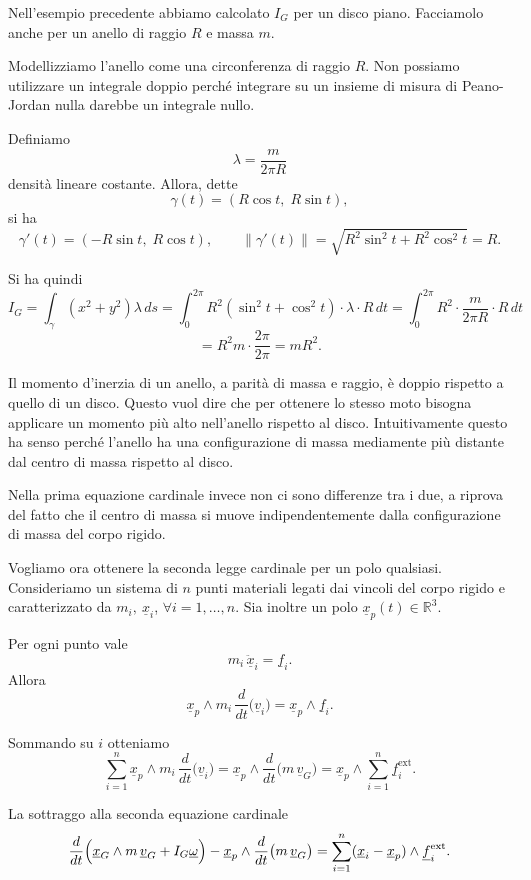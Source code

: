 \begin{example}{}
Nell'esempio precedente abbiamo calcolato \(I_G\) per un disco piano.
Facciamolo anche per un anello di raggio \(R\) e massa \(m\).

Modellizziamo l'anello come una circonferenza di raggio \(R\).
Non possiamo utilizzare un integrale doppio perché integrare su un insieme di
misura di Peano-Jordan nulla darebbe un integrale nullo.

Definiamo
\[
\lambda=\frac{m}{2\pi R}
\]
densità lineare costante. Allora, dette
\[
\gamma(t)=(R\cos t,\;R\sin t),
\]
si ha
\[
\gamma'(t)=(-R\sin t,\;R\cos t),
\qquad
\|\gamma'(t)\|=\sqrt{R^2\sin^2 t+R^2\cos^2 t}=R.
\]

Si ha quindi
\[
I_G=\int_{\gamma}(x^2+y^2)\lambda\,ds
=\int_0^{2\pi} R^2(\sin^2 t+\cos^2 t)\cdot \lambda \cdot R\,dt
=\int_0^{2\pi} R^2\cdot \frac{m}{2\pi R}\cdot R\,dt
\]
\[
=R^2m\cdot \frac{2\pi}{2\pi}=mR^2.
\]

Il momento d'inerzia di un anello, a parità di massa e raggio, è doppio rispetto
a quello di un disco. Questo vuol dire che per ottenere lo stesso moto bisogna
applicare un momento più alto nell'anello rispetto al disco. Intuitivamente
questo ha senso perché l'anello ha una configurazione di massa mediamente più
distante dal centro di massa rispetto al disco.

Nella prima equazione cardinale invece non ci sono differenze tra i due, a
riprova del fatto che il centro di massa si muove indipendentemente dalla
configurazione di massa del corpo rigido.
\end{example}



Vogliamo ora ottenere la seconda legge cardinale per un polo qualsiasi.
Consideriamo un sistema di \(n\) punti materiali legati dai vincoli del corpo
rigido e caratterizzato da \(m_i,\ \underline{x}_i\), \(\forall i=1,\dots,n\).
Sia inoltre un polo \(\underline{x}_p(t)\in\mathbb{R}^3\).

Per ogni punto vale
\[
m_i\,\underline{\ddot{x}}_i=\underline{f}_i.
\]
Allora
\[
\underline{x}_p\wedge m_i\,\frac{d}{dt}\bigl(\underline{v}_i\bigr)
=
\underline{x}_p\wedge \underline{f}_i.
\]

Sommando su \(i\) otteniamo
\[
\sum_{i=1}^n \underline{x}_p\wedge m_i\,\frac{d}{dt}\bigl(\underline{v}_i\bigr)
=
\underline{x}_p\wedge \frac{d}{dt}\bigl(m\,\underline{v}_G\bigr)
=
\underline{x}_p\wedge \sum_{i=1}^n \underline{f}_i^{\mathrm{ext}}.
\]

La sottraggo alla seconda equazione cardinale
\[
\frac{d}{dt}\Bigl(\underline{x}_G\wedge m\,\underline{v}_G+I_G\underline{\omega}\Bigr)
-
\underline{x}_p\wedge \frac{d}{dt}\bigl(m\,\underline{v}_G\bigr)
=
\sum_{i=1}^n (\underline{x}_i-\underline{x}_p)\wedge \underline{f}_i^{\mathrm{ext}}.
\]


